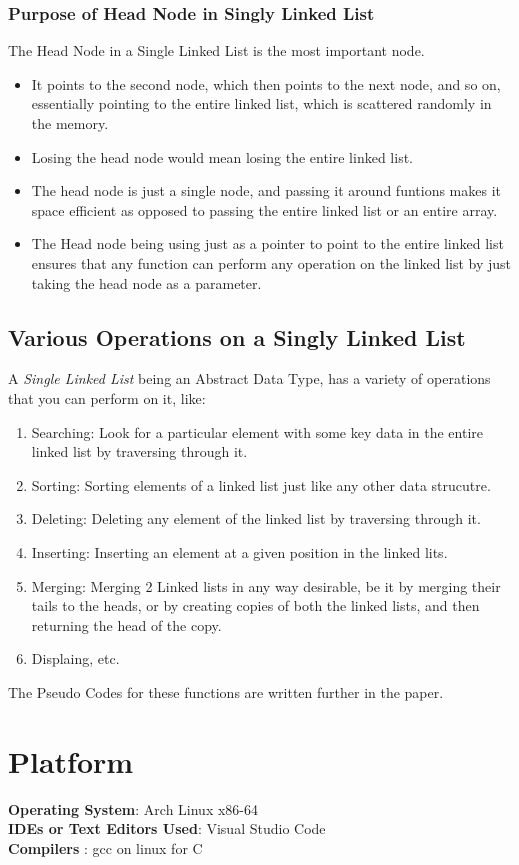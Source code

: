 \documentclass[11pt]{article}
\begin{document}
\subsubsection{Purpose of Head Node in Singly Linked List}
The Head Node in a Single Linked List is the most important node.
\begin{itemize}
	\item It points to the second node, which then points to the next node, and so on, essentially pointing to the entire linked list, which is scattered randomly in the memory.
	\item Losing the head node would mean losing the entire linked list.
	\item The head node is just a single node, and passing it around funtions makes it space efficient as opposed to passing the entire linked list or an entire array.
	\item The Head node being using just as a pointer to point to the entire linked list ensures that any function can perform any operation on the linked list by just taking the head node as a parameter.
\end{itemize}
\subsection{Various Operations on a Singly Linked List}
A \textit{Single Linked List} being an Abstract Data Type, has a variety of operations that you can perform on it, like:
\begin{enumerate}
	\item Searching: Look for a particular element with some key data in the entire linked list by traversing through it.
	\item Sorting: Sorting elements of a linked list just like any other data strucutre.
	\item Deleting: Deleting any element of the linked list by traversing through it.
	\item Inserting: Inserting an element at a given position in the linked lits.
	\item Merging: Merging 2 Linked lists in any way desirable, be it by merging their tails to the heads, or by creating copies of both the linked lists, and then returning the head of the copy.
	\item Displaing, etc.
\end{enumerate}

The Pseudo Codes for these functions are written further in the paper.
\section{Platform}
\textbf{Operating System}: Arch Linux x86-64 \\
\textbf{IDEs or Text Editors Used}: Visual Studio Code\\
\textbf{Compilers} : gcc on linux for C\\
\end{document}
